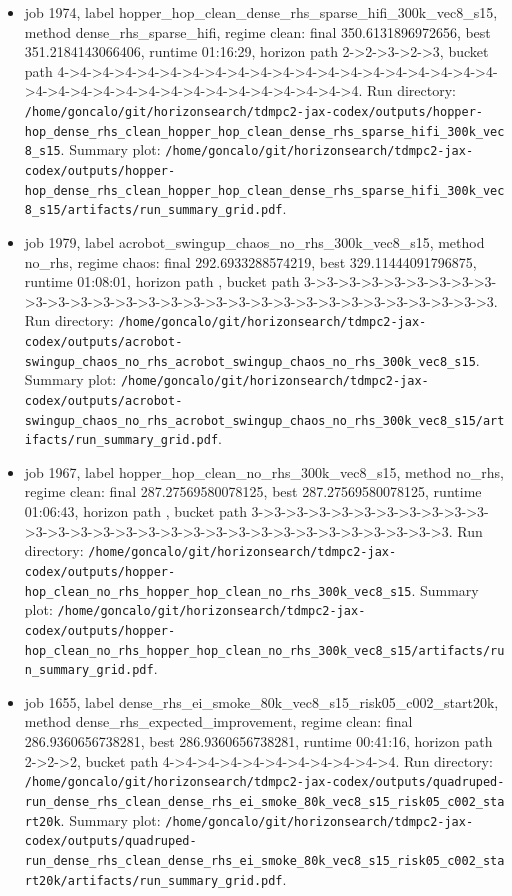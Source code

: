 \begin{itemize}
\item job 1974, label hopper\_hop\_clean\_dense\_rhs\_sparse\_hifi\_300k\_vec8\_s15, method dense\_rhs\_sparse\_hifi, regime clean: final 350.6131896972656, best 351.2184143066406, runtime 01:16:29, horizon path 2->2->3->2->3, bucket path 4->4->4->4->4->4->4->4->4->4->4->4->4->4->4->4->4->4->4->4->4->4->4->4->4->4->4->4->4->4->4->4->4->4->4. Run directory: \texttt{/home/goncalo/git/horizonsearch/tdmpc2-jax-codex/outputs/hopper-hop\_dense\_rhs\_clean\_hopper\_hop\_clean\_dense\_rhs\_sparse\_hifi\_300k\_vec8\_s15}. Summary plot: \texttt{/home/goncalo/git/horizonsearch/tdmpc2-jax-codex/outputs/hopper-hop\_dense\_rhs\_clean\_hopper\_hop\_clean\_dense\_rhs\_sparse\_hifi\_300k\_vec8\_s15/artifacts/run\_summary\_grid.pdf}.
\item job 1979, label acrobot\_swingup\_chaos\_no\_rhs\_300k\_vec8\_s15, method no\_rhs, regime chaos: final 292.6933288574219, best 329.11444091796875, runtime 01:08:01, horizon path , bucket path 3->3->3->3->3->3->3->3->3->3->3->3->3->3->3->3->3->3->3->3->3->3->3->3->3->3->3->3->3->3. Run directory: \texttt{/home/goncalo/git/horizonsearch/tdmpc2-jax-codex/outputs/acrobot-swingup\_chaos\_no\_rhs\_acrobot\_swingup\_chaos\_no\_rhs\_300k\_vec8\_s15}. Summary plot: \texttt{/home/goncalo/git/horizonsearch/tdmpc2-jax-codex/outputs/acrobot-swingup\_chaos\_no\_rhs\_acrobot\_swingup\_chaos\_no\_rhs\_300k\_vec8\_s15/artifacts/run\_summary\_grid.pdf}.
\item job 1967, label hopper\_hop\_clean\_no\_rhs\_300k\_vec8\_s15, method no\_rhs, regime clean: final 287.27569580078125, best 287.27569580078125, runtime 01:06:43, horizon path , bucket path 3->3->3->3->3->3->3->3->3->3->3->3->3->3->3->3->3->3->3->3->3->3->3->3->3->3->3->3->3->3. Run directory: \texttt{/home/goncalo/git/horizonsearch/tdmpc2-jax-codex/outputs/hopper-hop\_clean\_no\_rhs\_hopper\_hop\_clean\_no\_rhs\_300k\_vec8\_s15}. Summary plot: \texttt{/home/goncalo/git/horizonsearch/tdmpc2-jax-codex/outputs/hopper-hop\_clean\_no\_rhs\_hopper\_hop\_clean\_no\_rhs\_300k\_vec8\_s15/artifacts/run\_summary\_grid.pdf}.
\item job 1655, label dense\_rhs\_ei\_smoke\_80k\_vec8\_s15\_risk05\_c002\_start20k, method dense\_rhs\_expected\_improvement, regime clean: final 286.9360656738281, best 286.9360656738281, runtime 00:41:16, horizon path 2->2->2, bucket path 4->4->4->4->4->4->4->4->4->4->4. Run directory: \texttt{/home/goncalo/git/horizonsearch/tdmpc2-jax-codex/outputs/quadruped-run\_dense\_rhs\_clean\_dense\_rhs\_ei\_smoke\_80k\_vec8\_s15\_risk05\_c002\_start20k}. Summary plot: \texttt{/home/goncalo/git/horizonsearch/tdmpc2-jax-codex/outputs/quadruped-run\_dense\_rhs\_clean\_dense\_rhs\_ei\_smoke\_80k\_vec8\_s15\_risk05\_c002\_start20k/artifacts/run\_summary\_grid.pdf}.

\end{itemize}
